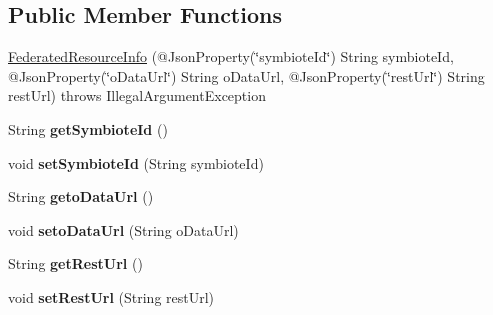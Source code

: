 \subsection*{Public Member Functions}
\begin{DoxyCompactItemize}
\item 
\hyperlink{classeu_1_1h2020_1_1symbiote_1_1cloud_1_1model_1_1internal_1_1FederatedResourceInfo_af9ab5dc12e6a855cdd851d86015e9696}{Federated\+Resource\+Info} (@Json\+Property(\char`\"{}symbiote\+Id\char`\"{}) String symbiote\+Id, @Json\+Property(\char`\"{}o\+Data\+Url\char`\"{}) String o\+Data\+Url, @Json\+Property(\char`\"{}rest\+Url\char`\"{}) String rest\+Url)  throws Illegal\+Argument\+Exception 
\item 
\mbox{\label{classeu_1_1h2020_1_1symbiote_1_1cloud_1_1model_1_1internal_1_1FederatedResourceInfo_aab865d1ec63e4d55a082314cc9b45e07}} 
String {\bfseries get\+Symbiote\+Id} ()
\item 
\mbox{\label{classeu_1_1h2020_1_1symbiote_1_1cloud_1_1model_1_1internal_1_1FederatedResourceInfo_a8c44c0cbb7788a762c49f42786d13d88}} 
void {\bfseries set\+Symbiote\+Id} (String symbiote\+Id)
\item 
\mbox{\label{classeu_1_1h2020_1_1symbiote_1_1cloud_1_1model_1_1internal_1_1FederatedResourceInfo_a6dce70a216a05e2810651411e62bfe3c}} 
String {\bfseries geto\+Data\+Url} ()
\item 
\mbox{\label{classeu_1_1h2020_1_1symbiote_1_1cloud_1_1model_1_1internal_1_1FederatedResourceInfo_a7a90ee9edcf8a54acc4e822743a63fee}} 
void {\bfseries seto\+Data\+Url} (String o\+Data\+Url)
\item 
\mbox{\label{classeu_1_1h2020_1_1symbiote_1_1cloud_1_1model_1_1internal_1_1FederatedResourceInfo_aaba7af66274c6deca413e472ff0b3d47}} 
String {\bfseries get\+Rest\+Url} ()
\item 
\mbox{\label{classeu_1_1h2020_1_1symbiote_1_1cloud_1_1model_1_1internal_1_1FederatedResourceInfo_a24edef5a18f9988ad4cfdd7eb589eee3}} 
void {\bfseries set\+Rest\+Url} (String rest\+Url)
\end{DoxyCompactItemize}


